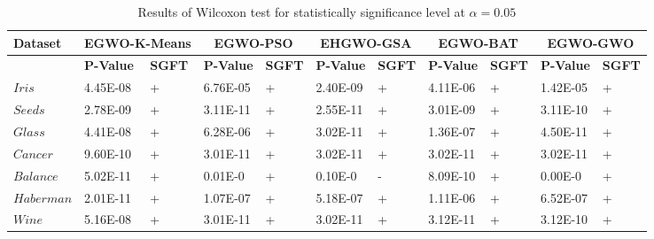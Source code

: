 \documentclass[review]{elsarticle}
\begin{document}
\begin{table}
\tiny
\caption{Results of Wilcoxon test for statistically significance level at $\alpha=0.05$}

\renewcommand{\arraystretch}{1}

\begin{tabular}{p{0.45in} | p{0.45in} p{0.25in} | p{0.40in} p{0.25in} | p{0.45in} p{0.30in}| p{0.45in} p{0.25in} | p{0.45in} p{0.25in}}
    \hline
  \textbf{Dataset} & \multicolumn{2}{c}{\textbf{EGWO-K-Means}} 	&	 \multicolumn{2}{c}{\textbf{EGWO-PSO}}  &	 \multicolumn{2}{c}{\textbf{EHGWO-GSA}}   &	\multicolumn{2}{c}{\textbf{EGWO-BAT}}   &\multicolumn{2}{c}{\textbf{EGWO-GWO}}  \\
\hline

    &		\textbf{P-Value} &		\textbf{SGFT} &	\textbf{P-Value} &\textbf{SGFT} &	 \textbf{P-Value} &\textbf{SGFT} 	& \textbf{P-Value} & \textbf{SGFT} & \textbf{P-Value} &	\textbf{SGFT} \\

\hline
$Iris$ &		 4.45E-08	&	+	&6.76E-05	&	+	&2.40E-09	&	+	&	4.11E-06	&	+    &1.42E-05	&	+	\\
$Seeds$&	2.78E-09	&	+	&3.11E-11	&	+	&2.55E-11	&	+	&	3.01E-09	&	+	&3.11E-10    &	+	\\
$Glass$&	4.41E-08	&	+	&6.28E-06	&	+	&3.02E-11	&	+	&	1.36E-07	&	+	&4.50E-11	&	+	\\
$Cancer$&	9.60E-10	&	+	&3.01E-11	&	+	&3.02E-11	&	+	&	3.02E-11	&	+	&3.02E-11	&	+	\\
$Balance$&	5.02E-11	&	+	&0.01E-0	&	+	&0.10E-0	&	-	&	8.09E-10	&	+	& 0.00E-0     &	+	\\
$Haberman$&2.01E-11	&	+	&1.07E-07	&	+	&5.18E-07	&	+	&	1.11E-06	&	+	&6.52E-07	&	+	\\
$Wine$&	5.16E-08	&	+	&3.01E-11	&	+	&3.02E-11	&	+	&	3.12E-11     &     +	&3.12E-10	&	+	\\

  \hline
  \end{tabular}
\label{tab:wt}
\end{table}
\end{document}

